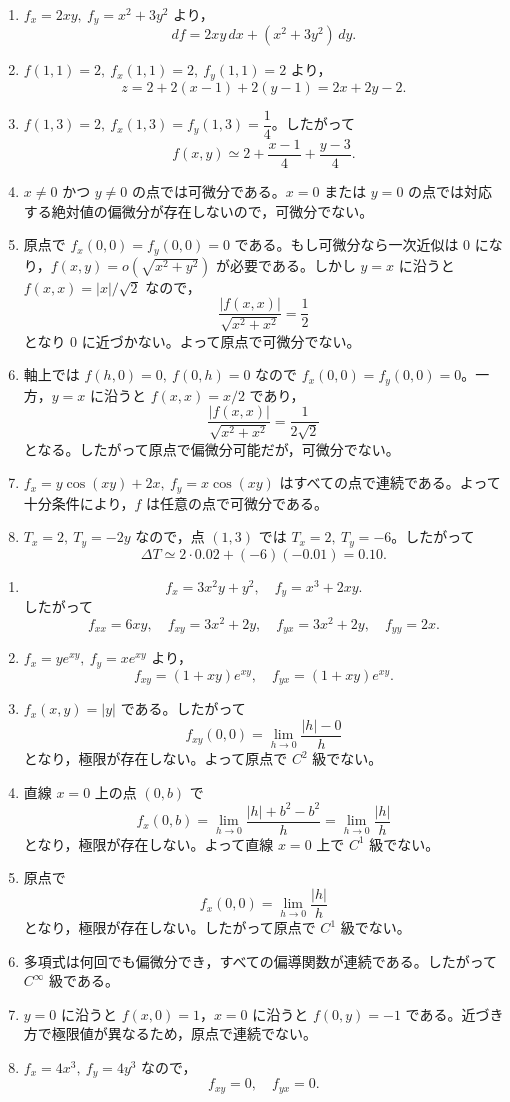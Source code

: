 \documentclass[dvipdfmx,a4paper,12pt]{jsarticle}
\newcommand{\subchap}[1]{\vspace{0.7em}{\large #1}\par\vspace{0.15em}}
\begin{document}
\begin{enumerate}[label=\arabic*.,start=17]
\item $f_x=2xy,\ f_y=x^2+3y^2$ より，
$$
df=2xy\,dx+(x^2+3y^2)\,dy.
$$
\item $f(1,1)=2,\ f_x(1,1)=2,\ f_y(1,1)=2$ より，
$$
z=2+2(x-1)+2(y-1)=2x+2y-2.
$$
\item $f(1,3)=2,\ f_x(1,3)=f_y(1,3)=\dfrac14$。したがって
$$
f(x,y)\simeq 2+\frac{x-1}{4}+\frac{y-3}{4}.
$$
\item $x\neq0$ かつ $y\neq0$ の点では可微分である。$x=0$ または $y=0$ の点では対応する絶対値の偏微分が存在しないので，可微分でない。
\item 原点で $f_x(0,0)=f_y(0,0)=0$ である。もし可微分なら一次近似は $0$ になり，$f(x,y)=o(\sqrt{x^2+y^2})$ が必要である。しかし $y=x$ に沿うと $f(x,x)=|x|/\sqrt2$ なので，
$$
\frac{|f(x,x)|}{\sqrt{x^2+x^2}}=\frac12
$$
となり $0$ に近づかない。よって原点で可微分でない。
\item 軸上では $f(h,0)=0,\ f(0,h)=0$ なので $f_x(0,0)=f_y(0,0)=0$。一方，$y=x$ に沿うと $f(x,x)=x/2$ であり，
$$
\frac{|f(x,x)|}{\sqrt{x^2+x^2}}=\frac{1}{2\sqrt2}
$$
となる。したがって原点で偏微分可能だが，可微分でない。
\item $f_x=y\cos(xy)+2x,\ f_y=x\cos(xy)$ はすべての点で連続である。よって十分条件により，$f$ は任意の点で可微分である。
\item $T_x=2,\ T_y=-2y$ なので，点 $(1,3)$ では $T_x=2,\ T_y=-6$。したがって
$$
\Delta T\simeq 2\cdot0.02+(-6)(-0.01)=0.10.
$$
\end{enumerate}

\subchap{D. $C^n$ 級・混合偏微分}

\begin{enumerate}[label=\arabic*.,start=25]
\item
$$
f_x=3x^2y+y^2,\quad f_y=x^3+2xy.
$$
したがって
$$
f_{xx}=6xy,\quad f_{xy}=3x^2+2y,\quad
f_{yx}=3x^2+2y,\quad f_{yy}=2x.
$$
\item $f_x=ye^{xy},\ f_y=xe^{xy}$ より，
$$
f_{xy}=(1+xy)e^{xy},\quad f_{yx}=(1+xy)e^{xy}.
$$
\item $f_x(x,y)=|y|$ である。したがって
$$
f_{xy}(0,0)=\lim_{h\to0}\frac{|h|-0}{h}
$$
となり，極限が存在しない。よって原点で $C^2$ 級でない。
\item 直線 $x=0$ 上の点 $(0,b)$ で
$$
f_x(0,b)=\lim_{h\to0}\frac{|h|+b^2-b^2}{h}
=\lim_{h\to0}\frac{|h|}{h}
$$
となり，極限が存在しない。よって直線 $x=0$ 上で $C^1$ 級でない。
\item 原点で
$$
f_x(0,0)=\lim_{h\to0}\frac{|h|}{h}
$$
となり，極限が存在しない。したがって原点で $C^1$ 級でない。
\item 多項式は何回でも偏微分でき，すべての偏導関数が連続である。したがって $C^\infty$ 級である。
\item $y=0$ に沿うと $f(x,0)=1$，$x=0$ に沿うと $f(0,y)=-1$ である。近づき方で極限値が異なるため，原点で連続でない。
\item $f_x=4x^3,\ f_y=4y^3$ なので，
$$
f_{xy}=0,\quad f_{yx}=0.
$$
\end{enumerate}
\end{document}

